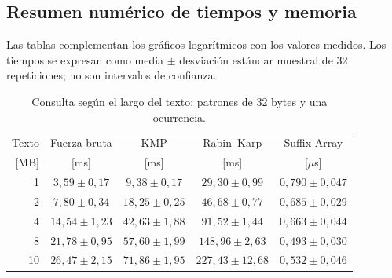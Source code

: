\subsection{Resumen numérico de tiempos y memoria}

Las tablas complementan los gráficos logarítmicos con los valores medidos.
Los tiempos se expresan como media \(\pm\) desviación estándar muestral
de 32 repeticiones; no son intervalos de confianza.

\begingroup
\small
\setlength{\tabcolsep}{4pt}
\renewcommand{\arraystretch}{1.1}

\begin{table}[!ht]
    \centering
    \caption{Consulta según el largo del texto: patrones de 32 bytes y una ocurrencia.}
    \label{tab:res-tiempo-texto}
    \begin{tabular}{@{}rcccc@{}}
        \toprule
        Texto & Fuerza bruta & KMP & Rabin--Karp & Suffix Array \\
        {[MB]} & [ms] & [ms] & [ms] & [\(\mu\)s] \\
        \midrule
        1 & \(3{,}59 \pm 0{,}17\) & \(9{,}38 \pm 0{,}17\) & \(29{,}30 \pm 0{,}99\) & \(0{,}790 \pm 0{,}047\) \\
        2 & \(7{,}80 \pm 0{,}34\) & \(18{,}25 \pm 0{,}25\) & \(46{,}68 \pm 0{,}77\) & \(0{,}685 \pm 0{,}029\) \\
        4 & \(14{,}54 \pm 1{,}23\) & \(42{,}63 \pm 1{,}88\) & \(91{,}52 \pm 1{,}44\) & \(0{,}663 \pm 0{,}044\) \\
        8 & \(21{,}78 \pm 0{,}95\) & \(57{,}60 \pm 1{,}99\) & \(148{,}96 \pm 2{,}63\) & \(0{,}493 \pm 0{,}030\) \\
        10 & \(26{,}47 \pm 2{,}15\) & \(71{,}86 \pm 1{,}95\) & \(227{,}43 \pm 12{,}68\) & \(0{,}532 \pm 0{,}046\) \\
        \bottomrule
    \end{tabular}
\end{table}

